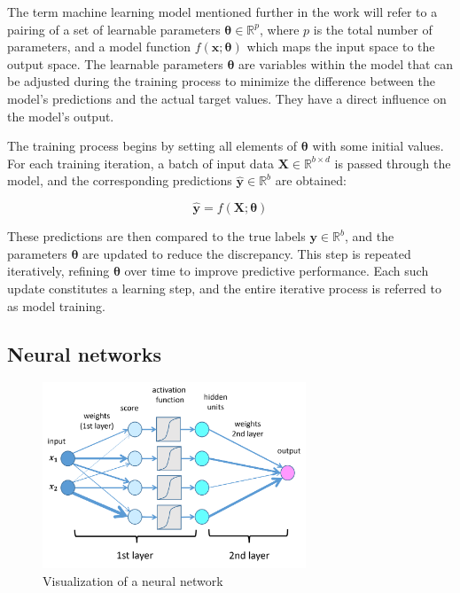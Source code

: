 \documentclass{pracalicmgr}
\begin{document}
The term machine learning model mentioned further in the work will refer to a pairing of a set of learnable parameters \( \boldsymbol{\theta} \in \mathbb{R}^p \), where \( p \) is the total number of parameters, and a model function \( f(\mathbf{x}; \boldsymbol{\theta}) \) which maps the input space to the output space. The learnable parameters \( \boldsymbol{\theta} \) are variables within the model that can be adjusted during the training process to minimize the difference between the model's predictions and the actual target values. They have a direct influence on the model's output.


The training process begins by setting all elements of \( \boldsymbol{\theta} \) with some initial values. For each training iteration, a batch of input data \( \mathbf{X} \in \mathbb{R}^{b \times d} \) is passed through the model, and the corresponding predictions \( \hat{\mathbf{y}} \in \mathbb{R}^b \) are obtained:

\[
\hat{\mathbf{y}} = f(\mathbf{X}; \boldsymbol{\theta})
\]

These predictions are then compared to the true labels \( \mathbf{y} \in \mathbb{R}^b \), and the parameters \( \boldsymbol{\theta} \) are updated to reduce the discrepancy. This step is repeated iteratively, refining \( \boldsymbol{\theta} \) over time to improve predictive performance. Each such update constitutes a learning step, and the entire iterative process is referred to as model training.

\subsection{Neural networks}

\begin{figure}[H]
\centering
\includegraphics[width=0.7\textwidth]{src/deepNet.png}
\caption{Visualization of a neural network \cite{deepLearningRoundup2025}}
\label{fig:deepN}
\end{figure}
\end{document}
